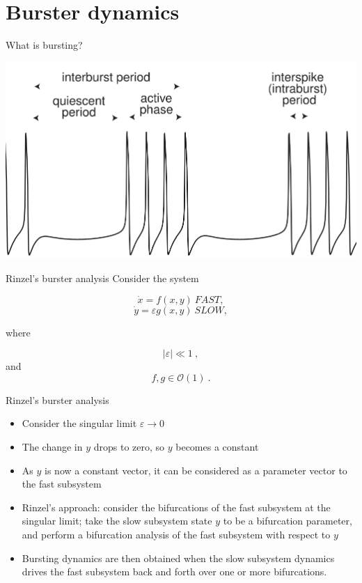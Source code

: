 \documentclass[,aspectratio=169]{beamer}
\begin{document}
\section{Burster dynamics}
\label{sec:orgaf082f0}
\begin{frame}[label={sec:org8031cf7}]{What is bursting?}
\begin{center}
\includegraphics[height=.85\textheight]{./burster.png}
\end{center}
\end{frame}

\begin{frame}[label={sec:orgd72dc10}]{Rinzel's burster analysis}
Consider the system

\[ \dot{x} = f(x,y) ~FAST,\]
\[ \dot{y} = \varepsilon g(x,y)~SLOW,\]

where 

\[ |\varepsilon| \ll 1~,\] and \[f,g \in \mathcal{O}(1)~.\]
\end{frame}

\begin{frame}[label={sec:orgbd37721}]{Rinzel's burster analysis}
\begin{itemize}[<+->]
\item Consider the singular limit \(\varepsilon \to 0\)
\item The change in \(y\) drops to zero, so \(y\) becomes a constant
\item As \(y\) is now a constant vector, it can be considered as a parameter vector to the fast subsystem
\item Rinzel's approach: consider the bifurcations of the fast subsystem at the singular limit; take the slow subsystem state \(y\) to be a bifurcation parameter, and perform a bifurcation analysis of the fast subsystem with respect to \(y\)
\item Bursting dynamics are then obtained when the slow subsystem dynamics drives the fast subsystem back and forth over one or more bifurcations.
\end{itemize}
\end{frame}
\end{document}
